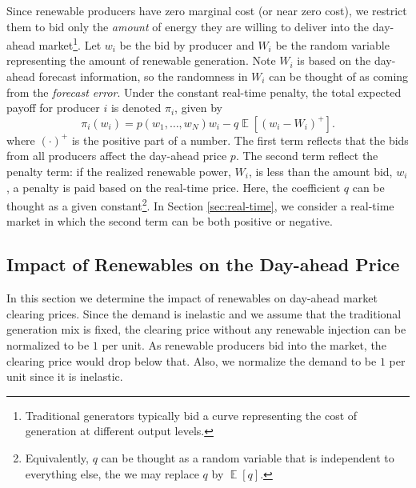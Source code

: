 \documentclass[journal]{IEEEtran}
\begin{document}
Since renewable producers have zero marginal cost (or near zero cost), we restrict them to bid only the \emph{amount} of energy they are willing to deliver into the day-ahead market\footnote{Traditional generators typically bid a curve representing the cost of generation at different output levels.}.  Let $w_i$ be the bid by producer and $W_i$ be the random variable representing the amount of renewable generation. Note $W_i$ is based on the day-ahead forecast information, so the randomness in $W_i$ can be thought of as coming from the \emph{forecast error}. Under the constant real-time penalty,  the total expected payoff for producer $i$ is denoted $\pi_i$, given by
\begin{equation}\label{eqn:pi}
\pi_i(w_i)=p(w_1,\dots,w_N)w_i - q\operatorname{\mathbb{E}}[(w_i-W_i)^+]. 
\end{equation} 
where $(\cdot)^+$ is the positive part of a number. The first term reflects that the bids from all producers affect the day-ahead price $p$.  The second term reflect the penalty term: if the realized renewable power, $W_i$, is less than the amount bid, $w_i$, a penalty is paid based on the real-time price. Here, the coefficient $q$ can be thought as a given constant\footnote{Equivalently, $q$ can be thought as a random variable that is independent to everything else, the we may replace $q$ by $\operatorname{\mathbb{E}}[q]$.}. In Section \ref{sec:real-time}, we consider a real-time market in which the second term can be both positive or negative. 
 

\subsection{Impact of Renewables on the Day-ahead Price}
In this section we determine the impact of renewables on day-ahead market clearing prices.  Since the demand is inelastic and we assume that the traditional generation mix is fixed, the clearing price without any renewable injection can be normalized to be $1$ per unit. As renewable producers bid into the market, the clearing price would drop below that. Also, we normalize the demand to be $1$ per unit since it is inelastic.  
\end{document}
